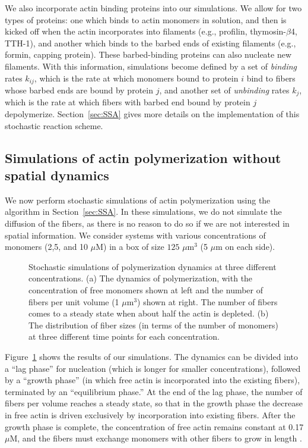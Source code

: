 \documentclass[11pt]{article}
\begin{document}
We also incorporate actin binding proteins into our simulations. We allow for two types of proteins: one which binds to actin monomers in solution, and then is kicked off when the actin incorporates into filaments (e.g., profilin, thymosin-$\beta$4, TTH-1), and another which binds to the barbed ends of existing filaments (e.g., formin, capping protein). These barbed-binding proteins can also nucleate new filaments. With this information, simulations become defined by a set of \emph{binding} rates $k_{ij}$, which is the rate at which monomers bound to protein $i$ bind to fibers whose barbed ends are bound by protein $j$, and another set of \emph{unbinding} rates $k_j$, which is the rate at which fibers with barbed end bound by protein $j$ depolymerize. Section\ \ref{sec:SSA} gives more details on the implementation of this stochastic reaction scheme. 

\subsection{Simulations of actin polymerization without spatial dynamics}
We now perform stochastic simulations of actin polymerization using the algorithm in Section\ \ref{sec:SSA}. In these simulations, we do not simulate the diffusion of the fibers, as there is no reason to do so if we are not interested in spatial information. We consider systems with various concentrations of monomers (2,5, and 10 $\mu$M) in a box of size $125$ $\mu$m$^3$ (5 $\mu$m on each side). 

\begin{figure}
\centering
{}
\caption{\label{fig:ActinPolyMix}Stochastic simulations of polymerization dynamics at three different concentrations. (a) The dynamics of polymerization, with the concentration of free monomers shown at left and the number of fibers per unit volume (1 $\mu$m$^3$) shown at right. The number of fibers comes to a steady state when about half the actin is depleted. (b) The distribution of fiber sizes (in terms of the number of monomers) at three different time points for each concentration.}
\end{figure}

Figure\ \ref{fig:ActinPolyMix} shows the results of our simulations. The dynamics can be divided into a ``lag phase'' for nucleation (which is longer for smaller concentrations), followed by a ``growth phase'' (in which free actin is incorporated into the existing fibers), terminated by an ``equilibrium phase.'' At the end of the lag phase, the number of fibers per volume reaches a steady state, so that in the growth phase the decrease in free actin is driven exclusively by incorporation into existing fibers. After the growth phase is complete, the concentration of free actin remains constant at 0.17 $\mu$M, and the fibers must exchange monomers with other fibers to grow in length \cite{hu2007theoretical}.
\end{document}
